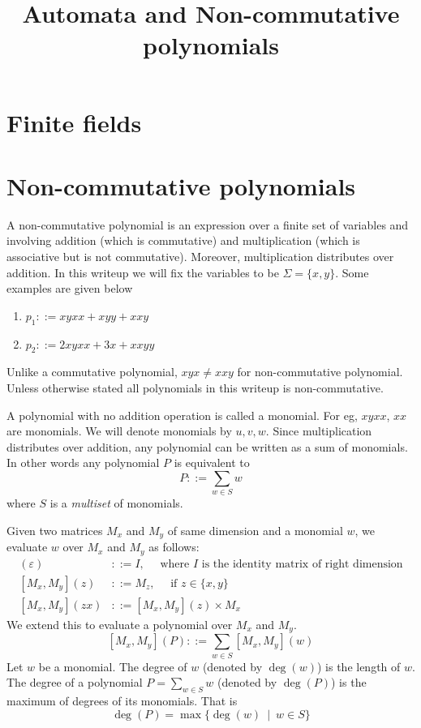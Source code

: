 \documentclass[english,course]{lecture}
\title{Automata and Non-commutative polynomials}
\newcommand{\Mxy}[1]{[M_x,M_y](#1)}
\newcommand{\degree}[1]{\deg(#1)}
\newcommand{\defs}{::=}
\begin{document}
\section{Finite fields}

\section{Non-commutative polynomials}
A non-commutative polynomial is an expression over a finite set of variables and involving addition (which is commutative) and multiplication (which is associative but is not commutative). Moreover, multiplication distributes over addition. In this writeup we will fix the variables to be $\Sigma = \{x,y\}$. Some examples are given below
\begin{enumerate}
\item $p_1 \defs xyxx + xyy + xxy$
\item $p_2 \defs 2xyxx + 3x + xxyy$
\end{enumerate}
Unlike a commutative polynomial, $xyx \neq xxy$ for non-commutative polynomial. Unless otherwise stated all polynomials in this writeup is non-commutative.

A polynomial with no addition operation is called a monomial. For eg, $xyxx$, $xx$ are monomials. We will denote monomials by $u, v, w$. Since multiplication distributes over addition, any polynomial can be written as a sum of monomials. In other words any polynomial $P$ is equivalent to 
\[
P \defs \sum_{w \in S} w
\]
where $S$ is a \emph{multiset} of monomials.

Given two matrices $M_x$ and $M_y$ of same dimension and a monomial $w$, we evaluate $w$ over $M_x$ and $M_y$ as follows:
\begin{align*}
\Mxy \varepsilon & \defs I, \quad \text{ where $I$ is the identity matrix of right dimension}\\
\Mxy z & \defs M_z, \quad \text{   if $z \in \{x,y\}$} \\
\Mxy {zx} & \defs \Mxy z \times M_x
\end{align*}
We extend this to evaluate a polynomial over $M_x$ and $M_y$.
\[
\Mxy P \defs \sum_{w \in S} \Mxy w
\]
Let $w$ be a monomial. The degree of $w$ (denoted by $\degree w$) is the length of $w$. The degree of a polynomial $P=\sum_{w \in S} w$ (denoted by $\degree P$) is the maximum of degrees of its monomials. That is 
\[\degree P = \max \{\degree w \ \mid\ w \in S\}\]
\end{document}
